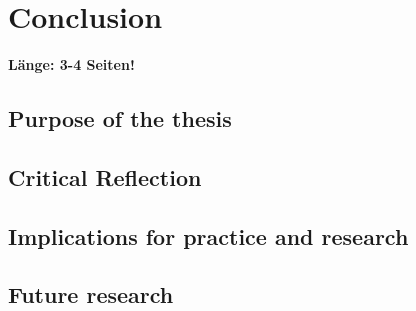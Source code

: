 \chapter{Conclusion}

\textbf{Länge: 3-4 Seiten!}

\section{Purpose of the thesis} \label{sec:findings}

\section{Critical Reflection} \label{sec:Reflection}

\section{Implications for practice and research} \label{Implications}

\section{Future research} \label{sec:FutureResearch}